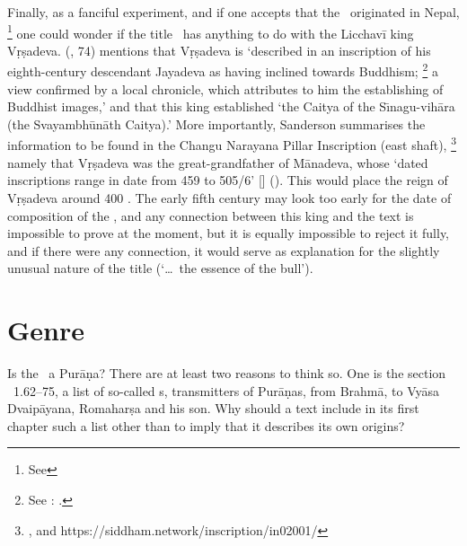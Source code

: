 Finally, as a fanciful experiment, and if one accepts 
that the \VSS\ originated in Nepal,%
		\footnote{See  \CHECK} 
one could wonder if the title \Vss\ 
has anything to do with the Licchavī king Vṛṣadeva.
\citeauthor{SandersonSaivaAge} 
(\citeyear{SandersonSaivaAge}, 74) mentions that  
Vṛṣadeva is `described in an inscription of his eighth-century 
descendant Jayadeva as having inclined towards Buddhism;%
			 \footnote{See : 
					.}
a view conﬁrmed by a local chronicle, which attributes to
him the establishing of Buddhist images,'
and that this king established 
`the Caitya of the Sı̄nagu-vihāra (the Svayambhūnāth Caitya).'
More importantly, Sanderson summarises the 
information to be found in the 
Changu Narayana Pillar Inscription (east shaft),%
		\footnote{,  and 
		https://siddham.network/inscription/in02001/} 
namely that Vṛṣadeva was the great-grandfather of Mānadeva, whose
`dated inscriptions range in date from 459 to 505/6' [\CE]
().
This would place 
the reign of Vṛṣadeva around 400 \CE. 
The early fifth century may look too early for the date of composition
of the \Vss, and any connection between this king
and the text is impossible to prove at the moment, 
but it is equally impossible to reject it fully, 
and if there were any connection, 
it would serve as explanation for the slightly
unusual nature of the title (`\dots\ the essence of the bull').
\hide{
}

%
%
\section{Genre}

Is the \VSS\ a Purāṇa? There are at least two reasons to think so.
One is the section \VSS\ 1.62--75, a list of so-called s, 
transmitters of Purāṇas, from Brahmā, to Vyāsa Dvaipāyana, Romaharṣa and 
his son. Why should a text include in its first chapter such a list other than to imply that it describes its own origins?

